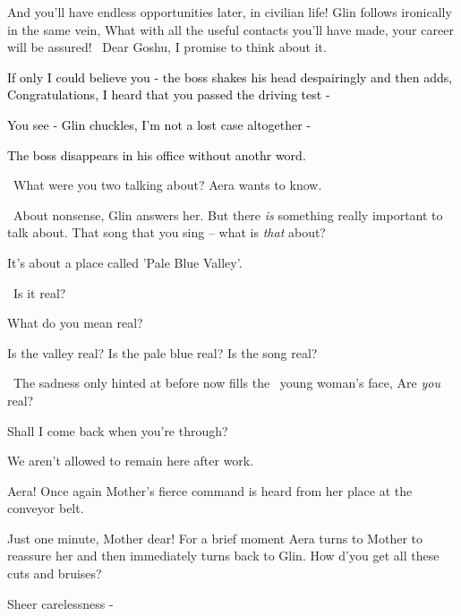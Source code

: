 \documentclass[letterpaper]{article}
\begin{document}
{\textquotedbl}And you'll have endless opportunities later, in civilian life!{\textquotedbl} Glin follows
ironically\textcolor{red}{ }in the same vein, {\textquotedbl}What with all the useful contacts you'll have made, your
career will be assured! ~Dear Goshu, I promise to think about it.{\textquotedbl} 

\textcolor{black}{{\textquotedbl}If only I could believe you -{\textquotedbl} the boss shakes his head despairingly and
then adds, {\textquotedbl}Congratulations, I heard that you passed the driving test - {\textquotedbl}}

\textcolor{black}{{\textquotedbl}You see -{\textquotedbl} Glin chuckles, {\textquotedbl}I'm not a lost case altogether
-{\textquotedbl}}

\textcolor{black}{The boss disappears in his office without anothr word. }

\textcolor{red}{\ }{\textquotedbl}What were you two talking about?{\textquotedbl} Aera wants to know.

~{\textquotedbl}About nonsense,{\textquotedbl} Glin answers her. {\textquotedbl}But there \textit{is} something really
important to talk about. That song that you sing -- what is \textit{that} about?{\textquotedbl} 

{\textquotedbl}It's about a place called 'Pale Blue Valley'.{\textquotedbl}

~{\textquotedbl}Is it real?{\textquotedbl}

{\textquotedbl}What do you mean real?{\textquotedbl}

{\textquotedbl}Is the valley real? Is the pale blue real? Is the song real?{\textquotedbl}

~The sadness only hinted at before now fills the \ young woman's face, {\textquotedbl}Are \textit{you}
real?{\textquotedbl} 

{\textquotedbl}Shall I come back when you're through?{\textquotedbl}

{\textquotedbl}We aren't allowed to remain here after work.{\textquotedbl}

{\textquotedbl}Aera!{\textquotedbl} Once again Mother's fierce command is heard from her place at the conveyor belt.

{\textquotedbl}Just one minute, Mother dear!{\textquotedbl} For a brief moment\MakeUppercase{ a}era turns to Mother to
reassure her and then immediately turns back to Glin. {\textquotedbl}How d'you get all these cuts and
bruises?{\textquotedbl} 

{\textquotedbl}Sheer carelessness -{\textquotedbl}
\end{document}
